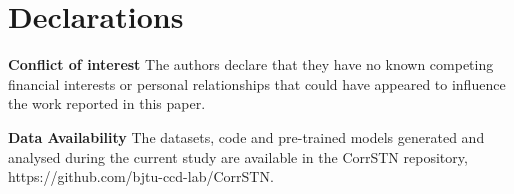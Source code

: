 \documentclass[sn-mathphys,iicol]{sn-jnl}
\theoremstyle{thmstyleone}\newtheorem{theorem}{Theorem}\newtheorem{proposition}[theorem]{Proposition}
\theoremstyle{thmstyletwo}\newtheorem{example}{Example}\newtheorem{remark}{Remark}
\theoremstyle{thmstylethree}\newtheorem{definition}{Definition}
\begin{document}
\section*{Declarations}
\textbf{Conflict of interest} The authors declare that they have no known competing ﬁnancial interests or personal relationships that could have appeared to inﬂuence the work reported in this paper.

\noindent\textbf{Data Availability} The datasets, code and pre-trained models generated and analysed during the current study are available in the CorrSTN repository, https://github.com/bjtu-ccd-lab/CorrSTN.




\end{document}
